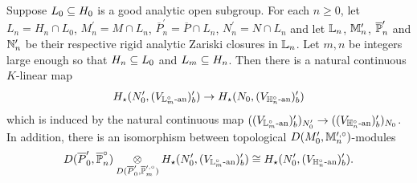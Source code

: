 \documentclass[10pt]{amsart}
\begin{document}
\begin{proposition}\label{prop:H(V_L)->H(V_H)}
Suppose $L_{0}\sub H_{0}$ is a good analytic open subgroup. For each $n\geq 0$, let $L_{n}=H_{n}\cap L_{0}$, $M_{n}^{\prime} = M\cap L_{n}$, $\overline{P}_{n}^{\prime} = \overline{P}\cap L_{n}$, $N_{n}^{\prime}= N\cap L_{n}$ and let $\L_{n}$, $\m_{n}^{\prime}$, $\overline{\P}_{n}^{\prime}$ and $\n^{\prime}_{n}$ be their respective rigid analytic Zariski closures in $\L_{n}$. Let $m,n$ be integers large enough so that $H_{n}\sub L_{0}$ and $L_{m}\sub H_{n}$. Then there is a natural continuous $K$-linear map \begin{equation}\label{eqn:H(V_L)->H(V_H)}
    H_{\star}(N_{0}^{\prime},(V_{\L_{m}^{\circ}\An})^{\prime}_{b}) \ra H_{\star}(N_{0},(V_{\h_{n}^{\circ}\An})^{\prime}_{b})
\end{equation} which is induced by the natural continuous map   $((V_{\L_{m}^{\circ}\An})^{\prime}_{b})_{N^{\prime}_{0}} \ra ((V_{\h_{n}^{\circ}\An})^{\prime}_{b})_{N_{0}}$. 
In addition, there is an isomorphism between topological $D(M_{0}^{\prime},\m_{n}^{\prime,\circ})$-modules \begin{equation}\label{eqn:isom_of_}
    D(\overline{P}^{\prime}_{0},\overline{\P}_{n}^{\circ})\underset{D(\overline{P}^{\prime}_{0},\overline{\P}^{\prime,\circ}_{m})}{\otimes} H_{\star}(N_{0}^{\prime},(V_{\L_{m}^{\circ}\An})^{\prime}_{b}) \cong H_{\star}(N_{0}^{\prime},(V_{\h_{n}^{\circ}\An})^{\prime}_{b}).
\end{equation}
\end{proposition} 
\end{document}
